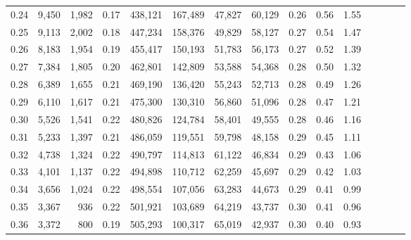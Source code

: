 \begin{tabular}{rrrcrrrrrrrrrrr}
0.24 &   9,450 &   1,982 &                                       0.17 &  438,121 &  167,489 &   47,827 &   60,129 &  0.26 &  0.56 &                         1.55 \\
0.25 &   9,113 &   2,002 &                                       0.18 &  447,234 &  158,376 &   49,829 &   58,127 &  0.27 &  0.54 &                         1.47 \\
0.26 &   8,183 &   1,954 &                                       0.19 &  455,417 &  150,193 &   51,783 &   56,173 &  0.27 &  0.52 &                         1.39 \\
0.27 &   7,384 &   1,805 &                                       0.20 &  462,801 &  142,809 &   53,588 &   54,368 &  0.28 &  0.50 &                         1.32 \\
0.28 &   6,389 &   1,655 &                                       0.21 &  469,190 &  136,420 &   55,243 &   52,713 &  0.28 &  0.49 &                         1.26 \\
0.29 &   6,110 &   1,617 &                                       0.21 &  475,300 &  130,310 &   56,860 &   51,096 &  0.28 &  0.47 &                         1.21 \\
0.30 &   5,526 &   1,541 &                                       0.22 &  480,826 &  124,784 &   58,401 &   49,555 &  0.28 &  0.46 &                         1.16 \\
0.31 &   5,233 &   1,397 &                                       0.21 &  486,059 &  119,551 &   59,798 &   48,158 &  0.29 &  0.45 &                         1.11 \\
0.32 &   4,738 &   1,324 &                                       0.22 &  490,797 &  114,813 &   61,122 &   46,834 &  0.29 &  0.43 &                         1.06 \\
0.33 &   4,101 &   1,137 &                                       0.22 &  494,898 &  110,712 &   62,259 &   45,697 &  0.29 &  0.42 &                         1.03 \\
0.34 &   3,656 &   1,024 &                                       0.22 &  498,554 &  107,056 &   63,283 &   44,673 &  0.29 &  0.41 &                         0.99 \\
0.35 &   3,367 &     936 &                                       0.22 &  501,921 &  103,689 &   64,219 &   43,737 &  0.30 &  0.41 &                         0.96 \\
0.36 &   3,372 &     800 &                                       0.19 &  505,293 &  100,317 &   65,019 &   42,937 &  0.30 &  0.40 &                         0.93 \\

\end{tabular}
